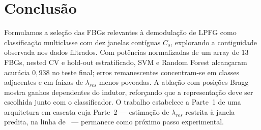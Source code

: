 \documentclass[conference]{IEEEtran}
\begin{document}
\section{Conclusão}

Formulamos a seleção das FBGs relevantes à demodulação de LPFG como classificação multiclasse com dez janelas contíguas $C_s$, explorando a contiguidade observada nos dados filtrados.
Com potências normalizadas de um array de $13$ FBGs, nested CV e hold-out estratificado, SVM e Random Forest alcançaram acurácia $0{,}938$ no teste final; erros remanescentes concentram-se em classes adjacentes e em faixas de $\lambda_{res}$ menos povoadas.
A ablação com posições Bragg mostra ganhos dependentes do indutor, reforçando que a representação deve ser escolhida junto com o classificador.
O trabalho estabelece a Parte~1 de uma arquitetura em cascata cuja Parte~2 --- estimação de $\lambda_{res}$ restrita à janela predita, na linha de~\cite{Barino2025TIM} --- permanece como próximo passo experimental.

\FloatBarrier


\end{document}
